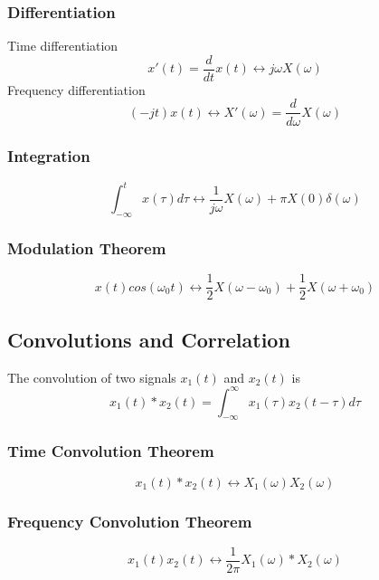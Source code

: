 \documentclass[]{article}
\begin{document}
\subsubsection{Differentiation}
Time differentiation
\begin{equation} x'(t) = \frac{d}{dt}x(t) \longleftrightarrow j\omega X(\omega)\label{fourier_time_differentiation}\end{equation}
Frequency differentiation
\begin{equation} (-jt)x(t) \longleftrightarrow X'(\omega) = \frac{d}{d\omega}X(\omega)\label{fourier_freq_differentiation} \end{equation}
\subsubsection{Integration}
\begin{equation} \int_{-\infty}^{t} x(\tau)d\tau \longleftrightarrow \frac{1}{j\omega}X(\omega) + \pi X(0)\delta(\omega)\label{fourier_integration}\end{equation}

\subsubsection{Modulation Theorem}
\begin{equation} x(t)cos(\omega_{0}t) \longleftrightarrow \frac{1}{2}X(\omega - \omega_{0}) + \frac{1}{2}X(\omega + \omega_{0})\label{modulation_theorem}\end{equation}

\subsection{Convolutions and Correlation}
The convolution of two signals $x_{1}(t)$ and $x_{2}(t)$ is
\begin{equation} x_{1}(t) * x_{2}(t) = \int_{-\infty}^{\infty} x_{1}(\tau) x_{2}(t-\tau)d\tau\label{convolution_def} \end{equation}
\subsubsection{Time Convolution Theorem}
\begin{equation} x_{1}(t) * x_{2}(t) \longleftrightarrow X_{1}(\omega) X_{2}(\omega)\label{time_convolution_thrm}\end{equation} 
\subsubsection{Frequency Convolution Theorem}
\begin{equation}x_{1}(t)x_{2}(t) \longleftrightarrow \frac{1}{2\pi}X_{1}(\omega)*X_{2}(\omega)\label{freq_convolution_thrm} \end{equation}
\end{document}
